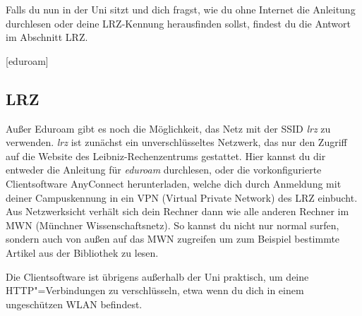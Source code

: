 Falls du nun in der Uni sitzt und dich fragst, wie du ohne Internet
die Anleitung durchlesen oder deine LRZ-Kennung herausfinden sollst, 
findest du die Antwort im Abschnitt LRZ.
\begin{urlList}
	[eduroam]
\end{urlList}

\subsection*{LRZ}
Außer Eduroam gibt es noch die Möglichkeit, das Netz mit der SSID
\emph{lrz} zu verwenden. \emph{lrz} ist zunächst ein unverschlüsseltes
Netzwerk, das nur den Zugriff auf die Website des
Leibniz-Rechen\-zentrums gestattet. Hier kannst du dir entweder die 
Anleitung für \mbox{\emph{eduroam}} durchlesen, oder die
vorkonfigurierte Clientsoftware AnyConnect herunterladen, welche dich
durch Anmeldung mit deiner Campuskennung in ein VPN (Virtual Private
Network) des LRZ einbucht. Aus Netzwerksicht verhält sich dein Rechner
dann wie alle anderen Rechner im MWN (Münchner Wissenschaftsnetz). So
kannst du nicht nur normal surfen, sondern auch von außen auf das
MWN zugreifen um zum Beispiel bestimmte Artikel aus der Bibliothek zu lesen.

Die Clientsoftware ist übrigens außerhalb der Uni praktisch, um deine
HTTP"=Verbindungen zu verschlüsseln, etwa wenn du dich in einem
ungeschützen WLAN befindest.


